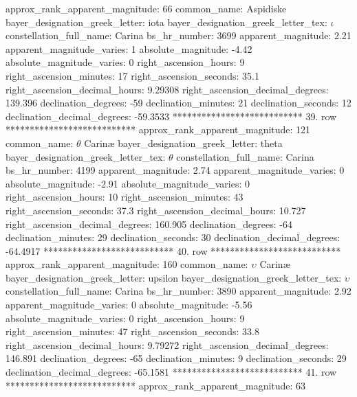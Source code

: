     approx_rank_apparent_magnitude: 66
                       common_name: Aspidiske
    bayer_designation_greek_letter: iota
bayer_designation_greek_letter_tex: $\iota$
           constellation_full_name: Carina
                      bs_hr_number: 3699
                apparent_magnitude: 2.21
         apparent_magnitude_varies: 1
                absolute_magnitude: -4.42
         absolute_magnitude_varies: 0
             right_ascension_hours: 9
           right_ascension_minutes: 17
           right_ascension_seconds: 35.1
     right_ascension_decimal_hours: 9.29308
   right_ascension_decimal_degrees: 139.396
               declination_degrees: -59
               declination_minutes: 21
               declination_seconds: 12
       declination_decimal_degrees: -59.3533
*************************** 39. row ***************************
    approx_rank_apparent_magnitude: 121
                       common_name: $\theta$ Carin{\ae}
    bayer_designation_greek_letter: theta
bayer_designation_greek_letter_tex: $\theta$
           constellation_full_name: Carina
                      bs_hr_number: 4199
                apparent_magnitude: 2.74
         apparent_magnitude_varies: 0
                absolute_magnitude: -2.91
         absolute_magnitude_varies: 0
             right_ascension_hours: 10
           right_ascension_minutes: 43
           right_ascension_seconds: 37.3
     right_ascension_decimal_hours: 10.727
   right_ascension_decimal_degrees: 160.905
               declination_degrees: -64
               declination_minutes: 29
               declination_seconds: 30
       declination_decimal_degrees: -64.4917
*************************** 40. row ***************************
    approx_rank_apparent_magnitude: 160
                       common_name: $\upsilon$ Carin{\ae}
    bayer_designation_greek_letter: upsilon
bayer_designation_greek_letter_tex: $\upsilon$
           constellation_full_name: Carina
                      bs_hr_number: 3890
                apparent_magnitude: 2.92
         apparent_magnitude_varies: 0
                absolute_magnitude: -5.56
         absolute_magnitude_varies: 0
             right_ascension_hours: 9
           right_ascension_minutes: 47
           right_ascension_seconds: 33.8
     right_ascension_decimal_hours: 9.79272
   right_ascension_decimal_degrees: 146.891
               declination_degrees: -65
               declination_minutes: 9
               declination_seconds: 29
       declination_decimal_degrees: -65.1581
*************************** 41. row ***************************
    approx_rank_apparent_magnitude: 63
